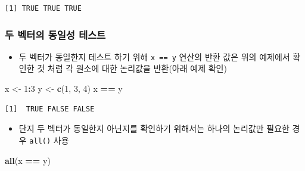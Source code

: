 \documentclass[
  11pt,
]{krantz}
\newenvironment{Shaded}{\begin{snugshade}}{\end{snugshade}}
\newcommand{\DecValTok}[1]{\textcolor[rgb]{0.06,0.06,0.06}{#1}}
\newcommand{\KeywordTok}[1]{\textcolor[rgb]{0.27,0.27,0.27}{\textbf{#1}}}
\newcommand{\NormalTok}[1]{#1}
\newcommand{\OperatorTok}[1]{\textcolor[rgb]{0.43,0.43,0.43}{\textbf{#1}}}
\newcommand{\StringTok}[1]{\textcolor[rgb]{0.5,0.5,0.5}{#1}}
\providecommand{\tightlist}{%
  \setlength{\itemsep}{0pt}\setlength{\parskip}{0pt}}
\begin{document}
\begin{Shaded}
\end{Shaded}

\begin{verbatim}
[1] TRUE TRUE TRUE
\end{verbatim}

\normalsize

\hypertarget{vec-identical}{%
\subsubsection{\texorpdfstring{\textbf{두 벡터의 동일성 테스트}}{두 벡터의 동일성 테스트}}\label{vec-identical}}

\begin{itemize}
\tightlist
\item
  두 벡터가 동일한지 테스트 하기 위해 \texttt{x\ ==\ y} 연산의 반환 값은 위의 예제에서 확인한 것 처럼 각 원소에 대한 논리값을 반환(아래 예제 확인)
\end{itemize}

\footnotesize

\begin{Shaded}
\begin{Highlighting}[]
\NormalTok{x <-}\StringTok{ }\DecValTok{1}\OperatorTok{:}\DecValTok{3}
\NormalTok{y <-}\StringTok{ }\KeywordTok{c}\NormalTok{(}\DecValTok{1}\NormalTok{, }\DecValTok{3}\NormalTok{, }\DecValTok{4}\NormalTok{)}
\NormalTok{x }\OperatorTok{==}\StringTok{ }\NormalTok{y}
\end{Highlighting}
\end{Shaded}

\begin{verbatim}
[1]  TRUE FALSE FALSE
\end{verbatim}

\normalsize

\begin{itemize}
\tightlist
\item
  단지 두 벡터가 동일한지 아닌지를 확인하기 위해서는 하나의 논리값만 필요한 경우 \texttt{all()} 사용
\end{itemize}

\footnotesize

\begin{Shaded}
\begin{Highlighting}[]
\KeywordTok{all}\NormalTok{(x }\OperatorTok{==}\StringTok{ }\NormalTok{y)}
\end{Highlighting}
\end{Shaded}
\end{document}
